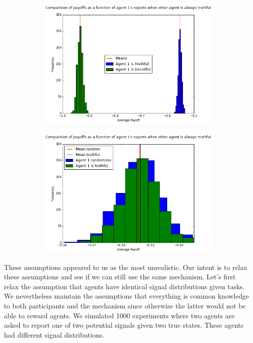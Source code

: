\documentclass{scrartcl}
\begin{document}
\begin{figure}[H]
\caption{Computational verification of Property 1}
\begin{subfigure}{0.4\textwidth}
\includegraphics[scale=0.4]{pp_1}
\end{subfigure}
\hspace{0.1\textwidth}
\begin{subfigure}{0.4\textwidth}
\includegraphics[scale=0.4]{rand}
\end{subfigure}
\end{figure}
These assumptions appeared to us as the most unrealistic. Our intent is to relax these assumptions and see if we can still use the same mechanism. Let's first relax the assumption that agents have identical signal distributions given tasks. We nevertheless maintain the assumptions that everything is common knowledge to both participants and the mechanism since otherwise the latter would not be able to reward agents. We simulated 1000 experiments where two agents are asked to report one of two potential signals given two true states. These agents had different signal distributions. 
\end{document}
